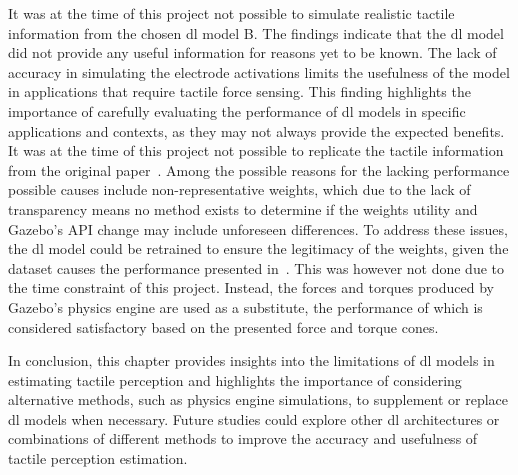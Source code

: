 It was at the time of this project not possible to simulate realistic tactile information from the chosen \gls{dl} model B. The findings indicate that the \gls{dl} model did not provide any useful information for reasons yet to be known. The lack of accuracy in simulating the electrode activations limits the usefulness of the model in applications that require tactile force sensing. This finding highlights the importance of carefully evaluating the performance of \gls{dl} models in specific applications and contexts, as they may not always provide the expected benefits. It was at the time of this project not possible to replicate the tactile information from the original paper~\cite{simulation-of-the-syntouch-biotac-sensor}. Among the possible reasons for the lacking performance possible causes include non-representative weights, which due to the lack of transparency means no method exists to determine if the weights utility and Gazebo's API change may include unforeseen differences. To address these issues, the \gls{dl} model could be retrained to ensure the legitimacy of the weights, given the dataset causes the performance presented in~\cite{simulation-of-the-syntouch-biotac-sensor}. This was however not done due to the time constraint of this project. Instead, the forces and torques produced by Gazebo's physics engine are used as a substitute, the performance of which is considered satisfactory based on the presented force and torque cones.\medskip

In conclusion, this chapter provides insights into the limitations of \gls{dl} models in estimating tactile perception and highlights the importance of considering alternative methods, such as physics engine simulations, to supplement or replace \gls{dl} models when necessary. Future studies could explore other \gls{dl} architectures or combinations of different methods to improve the accuracy and usefulness of tactile perception estimation.






